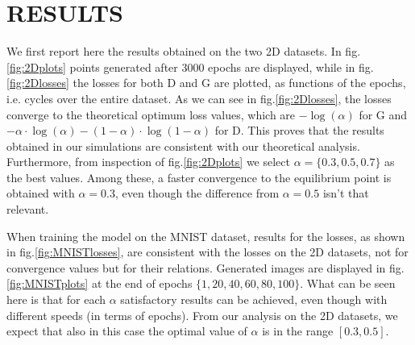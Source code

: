 \section{RESULTS} \label{results}

We first report here the results obtained on the two 2D datasets. In fig.\ref{fig:2Dplots} points generated after 3000 epochs are displayed, while in fig.\ref{fig:2Dlosses} the losses for both D and G are plotted, as functions of the epochs, i.e. cycles over the entire dataset.
As we can see in fig.\ref{fig:2Dlosses}, the losses converge to the theoretical optimum loss values, which are $-\log(\alpha)$ for G and $-\alpha\cdot\log(\alpha) - (1-\alpha)\cdot\log(1-\alpha)$ for D.
This proves that the results obtained in our simulations are consistent with our theoretical analysis. Furthermore, from inspection of fig.\ref{fig:2Dplots} we select $\alpha=\{0.3,0.5,0.7\}$ as the best values. Among these, a faster convergence to the equilibrium point is obtained with $\alpha=0.3$, even though the difference from $\alpha=0.5$ isn't that relevant.

When training the model on the MNIST dataset, results for the losses, as shown in fig.\ref{fig:MNISTlosses}, are consistent with the losses on the 2D datasets, not for convergence values but for their relations. Generated images are displayed in fig.\ref{fig:MNISTplots} at the end of epochs $\{1,20,40,60,80,100\}$. What can be seen here is that for each $\alpha$ satisfactory results can be achieved, even though with different speeds (in terms of epochs). From our analysis on the 2D datasets, we expect that also in this case the optimal value of $\alpha$ is in the range $[0.3,0.5]$.

